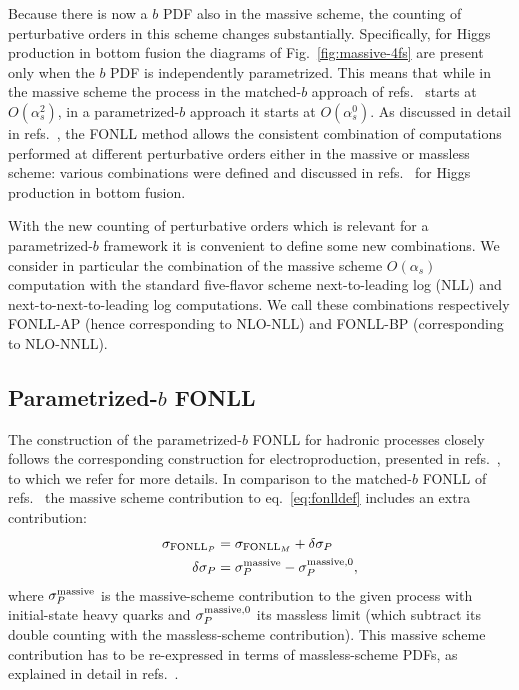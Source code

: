 Because there is now a $b$ PDF also in the massive scheme, the
counting of perturbative orders in this scheme
changes substantially. Specifically, for Higgs production in bottom
fusion the diagrams of Fig.~\ref{fig:massive-4fs} are present only
when the $b$ PDF is independently parametrized. This means that while 
in the
massive scheme the process in the matched-$b$ approach of
refs.~\cite{Forte:2015hba,Forte:2016sja}  starts at $O(\alpha_s^2)$,
in a parametrized-$b$ approach it starts at 
$O(\alpha_s^0)$. As discussed in detail in
refs.~\cite{Forte:2010ta,Forte:2015hba,Forte:2016sja},
the FONLL method allows the  consistent combination of computations performed
at different perturbative orders either in the massive or massless
scheme: various combinations were defined and discussed  in
refs.~\cite{Forte:2015hba,Forte:2016sja} for Higgs production in
bottom fusion.

With the new counting of perturbative orders which is relevant for a
parametrized-$b$ framework it is convenient to define some new
combinations. We  consider in particular the combination of 
the massive scheme $O(\alpha_s)$ computation  with the standard
five-flavor scheme next-to-leading log (NLL) and
next-to-next-to-leading log  computations. We  call these
combinations respectively FONLL-AP (hence corresponding to NLO-NLL)
and FONLL-BP (corresponding to  NLO-NNLL).


\subsection{Parametrized-$b$ FONLL}
\label{sec:parbfonll}

The construction of the parametrized-$b$ FONLL for hadronic processes
closely follows the corresponding construction for electroproduction,
presented in refs.~\cite{Ball:2015tna,Ball:2015dpa}, to which we refer
for more details. In comparison to the matched-$b$ FONLL of
refs.~\cite{Forte:2015hba,Forte:2016sja} the massive scheme
contribution to eq.~\eqref{eq:fonlldef} includes an extra contribution:
\begin{align}
  \label{eq:delta-i}
  \sigma_{\text{FONLL}_P} &= \sigma_{\text{FONLL}_M} +
  \delta\sigma_P\nonumber\\ 
  \quad \quad \delta\sigma_P &= \sigma^{\rm massive}_{P} - \sigma^{{\rm
      massive},0}_{P},
\end{align}
where $\sigma^{\rm massive}_{P}$ is the massive-scheme contribution to
the given process with initial-state heavy quarks and $\sigma^{{\rm
      massive},0}_{P}$ its massless limit (which subtract its double
counting with the massless-scheme contribution). This massive scheme
contribution has to be re-expressed in terms of massless-scheme PDFs,
as explained in detail in
refs.~\cite{Cacciari:1998it,Forte:2010ta,Ball:2015tna,Ball:2015dpa,Forte:2015hba,Forte:2016sja}.

